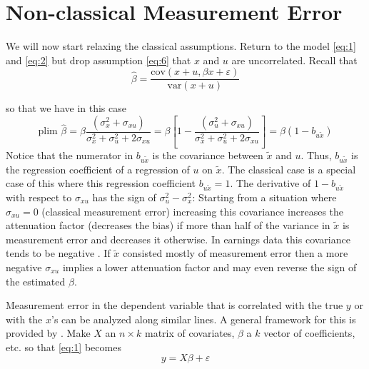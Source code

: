 \documentclass[12pt]{article}
\begin{document}
\section*{Non-classical Measurement Error}
We will now start relaxing the classical assumptions. Return to the model \eqref{eq:1} and \eqref{eq:2} but drop assumption \eqref{eq:6} that $x$ and $u$ are uncorrelated. Recall that
\[
\hat{\beta} = \frac{\text{cov}(x + u, \beta x + \varepsilon)}{\text{var}(x + u)}
\]

so that we have in this case
\begin{equation}
\label{eq:12}
\text{plim } \hat{\beta} = \beta \frac{(\sigma_x^2 + \sigma_{xu})}{\sigma_x^2 + \sigma_u^2 + 2\sigma_{xu}} = \beta\left[1 - \frac{(\sigma_u^2 + \sigma_{xu})}{\sigma_x^2 + \sigma_u^2 + 2\sigma_{xu}}\right] = \beta(1 - b_{u\tilde{x}})
\end{equation}
Notice that the numerator in $b_{u\tilde{x}}$ is the covariance between $\tilde{x}$ and $u$. Thus, $b_{u\tilde{x}}$ is the regression coefficient of a regression of $u$ on $\tilde{x}$. The classical case is a special case of this where this regression coefficient $b_{u\tilde{x}} = 1$. The derivative of $1 - b_{u\tilde{x}}$ with respect to $\sigma_{xu}$ has the sign of $\sigma_u^2 - \sigma_x^2$: Starting from a situation where $\sigma_{xu} = 0$ (classical measurement error) increasing this covariance increases the attenuation factor (decreases the bias) if more than half of the variance in $\tilde{x}$ is measurement error and decreases it otherwise. In earnings data this covariance tends to be negative \cite{Bound_Krueger_1991}. If $\tilde{x}$ consisted mostly of measurement error then a more negative $\sigma_{xu}$ implies a lower attenuation factor and may even reverse the sign of the estimated $\beta$.

Measurement error in the dependent variable that is correlated with the true $y$ or with the $x$'s can be analyzed along similar lines. A general framework for this is provided by \cite{Bound_etal_1994}. Make $X$ an $n \times k$ matrix of covariates, $\beta$ a $k$ vector of coefficients, etc. so that \eqref{eq:1} becomes
\[
y = X\beta + \varepsilon
\]
\end{document}
